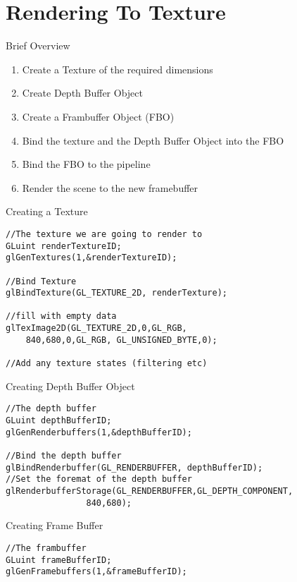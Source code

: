 \part{Rendering To Texture}
\frame{\partpage}

\begin{frame}{Brief Overview}
	\begin{enumerate}
		\item\pause Create a Texture of the required dimensions
		\item\pause Create Depth Buffer Object
		\item\pause Create a Frambuffer Object (FBO)
		\item\pause Bind the texture and the Depth Buffer Object into the FBO
		\item\pause Bind the FBO to the pipeline
		\item\pause Render the scene to the new framebuffer
	\end{enumerate}
\end{frame}

\begin{frame}[fragile]{Creating a Texture}
	\begin{lstlisting}
//The texture we are going to render to
GLuint renderTextureID;
glGenTextures(1,&renderTextureID);

//Bind Texture
glBindTexture(GL_TEXTURE_2D, renderTexture);

//fill with empty data
glTexImage2D(GL_TEXTURE_2D,0,GL_RGB,
	840,680,0,GL_RGB, GL_UNSIGNED_BYTE,0);

//Add any texture states (filtering etc)
	\end{lstlisting}
\end{frame}

\begin{frame}[fragile]{Creating Depth Buffer Object}
	\begin{lstlisting}
//The depth buffer
GLuint depthBufferID;
glGenRenderbuffers(1,&depthBufferID);

//Bind the depth buffer
glBindRenderbuffer(GL_RENDERBUFFER, depthBufferID);
//Set the foremat of the depth buffer
glRenderbufferStorage(GL_RENDERBUFFER,GL_DEPTH_COMPONENT,
				840,680);
	\end{lstlisting}
\end{frame}

\begin{frame}[fragile]{Creating Frame Buffer}
	\begin{lstlisting}
//The frambuffer
GLuint frameBufferID;
glGenFramebuffers(1,&frameBufferID);
	\end{lstlisting}
\end{frame}

